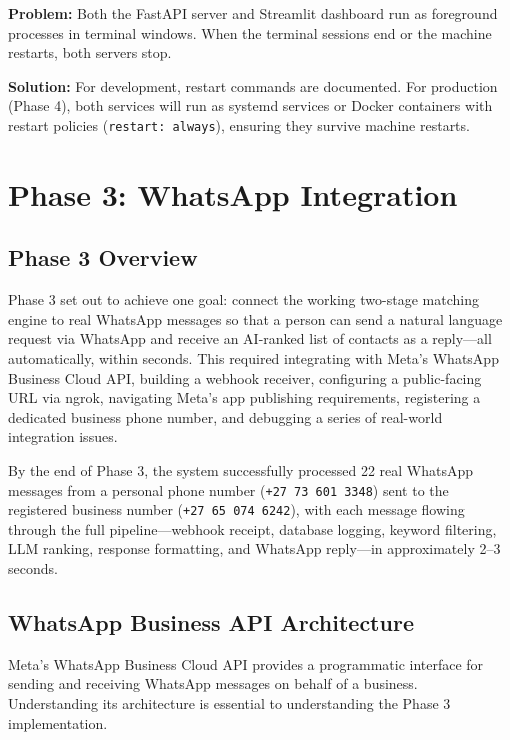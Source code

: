 \documentclass[12pt, a4paper]{report}
\begin{document}
\textbf{Problem:} Both the FastAPI server and Streamlit dashboard run as foreground processes in terminal windows. When the terminal sessions end or the machine restarts, both servers stop.

\textbf{Solution:} For development, restart commands are documented. For production (Phase 4), both services will run as systemd services or Docker containers with restart policies (\texttt{restart: always}), ensuring they survive machine restarts.

\chapter{Phase 3: WhatsApp Integration}

\section{Phase 3 Overview}

Phase 3 set out to achieve one goal: connect the working two-stage matching engine to real WhatsApp messages so that a person can send a natural language request via WhatsApp and receive an AI-ranked list of contacts as a reply---all automatically, within seconds. This required integrating with Meta's WhatsApp Business Cloud API, building a webhook receiver, configuring a public-facing URL via ngrok, navigating Meta's app publishing requirements, registering a dedicated business phone number, and debugging a series of real-world integration issues.

By the end of Phase 3, the system successfully processed 22 real WhatsApp messages from a personal phone number (\texttt{+27 73 601 3348}) sent to the registered business number (\texttt{+27 65 074 6242}), with each message flowing through the full pipeline---webhook receipt, database logging, keyword filtering, LLM ranking, response formatting, and WhatsApp reply---in approximately 2--3 seconds.

\section{WhatsApp Business API Architecture}

Meta's WhatsApp Business Cloud API provides a programmatic interface for sending and receiving WhatsApp messages on behalf of a business. Understanding its architecture is essential to understanding the Phase 3 implementation.
\end{document}
